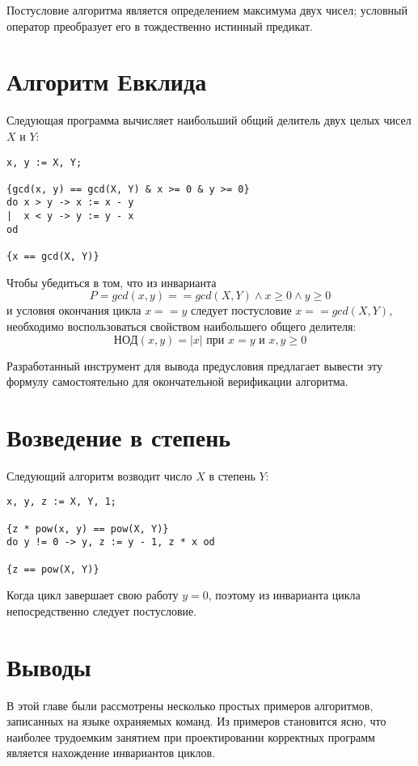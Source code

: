 Постусловие алгоритма является определением максимума двух чисел; условный оператор преобразует его 
в тождественно истинный предикат. 

\section{Алгоритм Евклида}
Следующая программа вычисляет наибольший общий делитель двух целых чисел $X$ и $Y$:
\begin{BVerbatim}
x, y := X, Y;

{gcd(x, y) == gcd(X, Y) & x >= 0 & y >= 0}
do x > y -> x := x - y
|  x < y -> y := y - x
od

{x == gcd(X, Y)}
\end{BVerbatim}

Чтобы убедиться в том, что из инварианта
\begin{equation}
    P = gcd(x, y) == gcd(X, Y) \wedge x \geq 0 \wedge y \geq 0
\end{equation}
и условия окончания цикла $x == y$ следует постусловие $x == gcd(X, Y)$, необходимо
воспользоваться свойством наибольшего общего делителя:
\begin{equation}
    НОД(x, y) = |x|\text{ при } x = y\text{ и }x, y \geq 0
\end{equation}

Разработанный инструмент для вывода предусловия предлагает вывести эту формулу самостоятельно для 
окончательной верификации алгоритма.

\section{Возведение в степень}
Следующий алгоритм возводит число $X$ в степень $Y$:
\begin{BVerbatim}
x, y, z := X, Y, 1;

{z * pow(x, y) == pow(X, Y)}
do y != 0 -> y, z := y - 1, z * x od

{z == pow(X, Y)}
\end{BVerbatim} 

Когда цикл завершает свою работу $y = 0$, поэтому из инварианта цикла непосредственно следует постусловие.
\section{Выводы} \label{ch4:conclusion}
В этой главе были рассмотрены несколько простых примеров алгоритмов, записанных на
языке охраняемых команд. Из примеров становится ясно, что наиболее
трудоемким занятием при проектировании корректных программ является нахождение 
инвариантов циклов.

%
